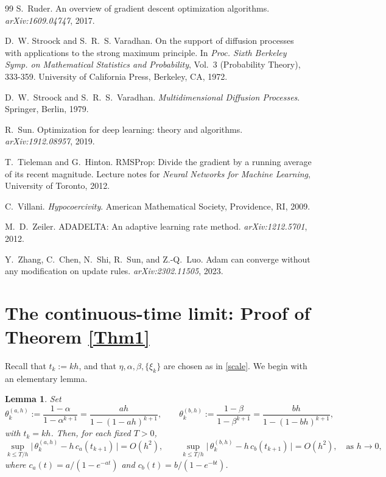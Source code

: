 \documentclass[11pt, a4paper,leqno]{amsart}
\newtheorem{lemma}{Lemma}[section]
\theoremstyle{definition}
\numberwithin{equation}{section}
\begin{document}
\begin{thebibliography}{99}
S.~Ruder.
\newblock An overview of gradient descent optimization algorithms.
\newblock \emph{arXiv:1609.04747}, 2017.

D.~W. Stroock and S.~R.~S. Varadhan.
\newblock On the support of diffusion processes with applications to the strong maximum principle.
\newblock In \emph{Proc. Sixth Berkeley Symp. on Mathematical Statistics and Probability}, Vol.~3 (Probability Theory), 333-359.
\newblock University of California Press, Berkeley, CA, 1972.

D.~W.~Stroock and S.~R.~S.~Varadhan.
\newblock \emph{Multidimensional Diffusion Processes}.
\newblock Springer, Berlin, 1979.

R.~Sun.
\newblock Optimization for deep learning: theory and algorithms.
\newblock \emph{arXiv:1912.08957}, 2019.

T.~Tieleman and G.~Hinton.
\newblock RMSProp: Divide the gradient by a running average of its recent magnitude.
\newblock Lecture notes for \emph{Neural Networks for Machine Learning}, University of Toronto, 2012.

C.~Villani.
\newblock \emph{Hypocoercivity}.
\newblock American Mathematical Society, Providence, RI, 2009.

M.~D.~Zeiler.
\newblock ADADELTA: An adaptive learning rate method.
\newblock \emph{arXiv:1212.5701}, 2012.

Y.~Zhang, C.~Chen, N.~Shi, R.~Sun, and Z.-Q.~Luo.
\newblock Adam can converge without any modification on update rules.
\newblock \emph{arXiv:2302.11505}, 2023.

\end{thebibliography}


\newpage
\appendix




\section{The continuous-time limit: Proof of Theorem \ref{Thm1}}\label{aaapp}

Recall that $t_k:=kh$, and that $\eta, \alpha, \beta, \{\xi_k\}$ are chosen as in \eqref{scale}. We begin with an elementary lemma.

\begin{lemma}\label{lem:bc}
Set
\[
\theta_k^{(a,h)}:=\frac{1-\alpha}{1-\alpha^{k+1}}
=\frac{ah}{1-(1-ah)^{k+1}},\qquad
\theta_k^{(b,h)}:=\frac{1-\beta}{1-\beta^{k+1}}
=\frac{bh}{1-(1-bh)^{k+1}},
\]
with $t_k=kh$. Then, for each fixed $T>0$,
\[
\sup_{k\le T/h}\Big|\,\theta_k^{(a,h)}-h\,c_a(t_{k+1})\,\Big| = O(h^2),
\qquad
\sup_{k\le T/h}\Big|\,\theta_k^{(b,h)}-h\,c_b(t_{k+1})\,\Big| = O(h^2),
\quad\text{as }h\to 0,
\]
where $c_a(t)={a}/{(1-e^{-at})}$ and $c_b(t)={b}/{(1-e^{-bt})}$.
\end{lemma}
\end{document}
